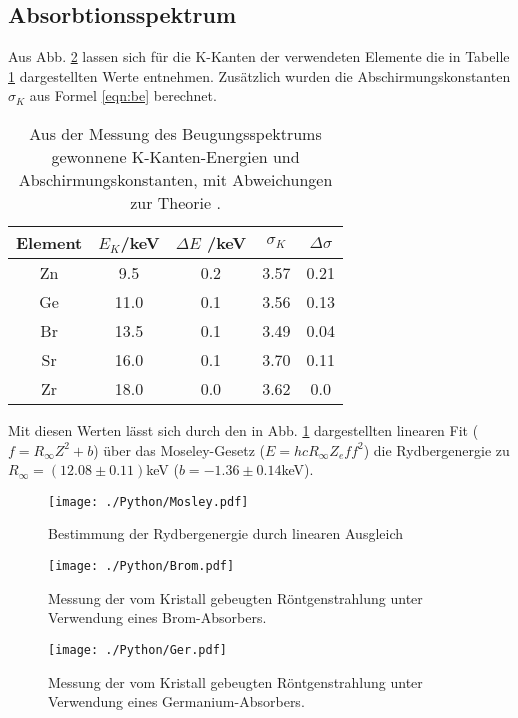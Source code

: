 \subsection{Absorbtionsspektrum}
\label{sec:absorption}
Aus Abb. \ref{fig:brom} lassen sich für die K-Kanten der verwendeten Elemente die in Tabelle \ref{tab:Kkanten} dargestellten Werte entnehmen. Zusätzlich wurden die Abschirmungskonstanten $\sigma_K$ aus Formel \eqref{eqn:be} berechnet.

\begin{table}
  \centering
  \caption{Aus der Messung des Beugungsspektrums gewonnene K-Kanten-Energien und Abschirmungskonstanten, mit Abweichungen zur Theorie \cite{princeton}.}
  \label{tab:Kkanten}
  \begin{tabular}{|c|c|c|c|c|}
    \toprule
    Element & $E_K$/keV & $\Delta E$ /keV& $\sigma_K$ & $\Delta \sigma$ \\
    \midrule
    Zn & 9.5 & 0.2 & 3.57 & 0.21\\
    Ge & 11.0 & 0.1 & 3.56 & 0.13\\
    Br  & 13.5 & 0.1 & 3.49 & 0.04\\
    Sr  & 16.0 & 0.1 & 3.70 & 0.11\\
    Zr  & 18.0 & 0.0 & 3.62 & 0.0 \\
    \bottomrule
    \end{tabular}
\end{table}

Mit diesen Werten lässt sich durch den in Abb. \ref{fig:moseley} dargestellten linearen Fit ($f=R_\infty Z^2 +b$) über das Moseley-Gesetz ($E = hc R_\infty Z_eff^2$) die Rydbergenergie zu $R_\infty = (12.08 \pm 0.11)$keV ($b= -1.36 \pm 0.14$keV).

\begin{figure}
  \centering
  \texttt{[image: ./Python/Mosley.pdf]}
  \caption{Bestimmung der Rydbergenergie durch linearen Ausgleich}
  \label{fig:moseley}
\end{figure}

\begin{figure}
  \centering
  \texttt{[image: ./Python/Brom.pdf]}
  \caption{Messung der vom Kristall gebeugten Röntgenstrahlung unter Verwendung eines Brom-Absorbers.}
  \label{fig:brom}
\end{figure}


\begin{figure}
  \centering
  \texttt{[image: ./Python/Ger.pdf]}
  \caption{Messung der vom Kristall gebeugten Röntgenstrahlung unter Verwendung eines Germanium-Absorbers.}
  \label{fig:ger}
\end{figure}


